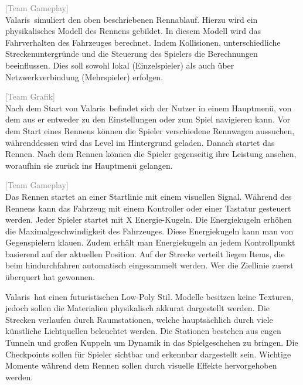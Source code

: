 \documentclass[parskip=full]{scrartcl}
\newcommand{\codename}{Valaris}
\begin{document}
	\textcolor{gray}{[Team Gameplay]}\\
	\codename\ simuliert den oben beschriebenen Rennablauf. Hierzu wird ein physikalisches Modell des Rennens gebildet. In diesem Modell wird das Fahrverhalten
	des Fahrzeuges berechnet. Indem Kollisionen, unterschiedliche Streckenuntergründe und die Steuerung des Spielers die Berechnungen beeinflussen.
	Dies soll sowohl lokal (Einzelspieler) als auch über Netzwerkverbindung (Mehrspieler) erfolgen. \par

	\textcolor{gray}{[Team Grafik]}\\
	Nach dem Start von \codename\ befindet sich der Nutzer in einem Hauptmenü, von dem aus er entweder zu den Einstellungen oder zum Spiel navigieren kann. Vor dem Start eines Rennens
	können die Spieler verschiedene Rennwagen aussuchen, währenddessen wird das Level im Hintergrund geladen. Danach startet das Rennen.
	Nach dem Rennen können die Spieler gegenseitig ihre Leistung ansehen, woraufhin sie zurück ins Hauptmenü gelangen. \par

	\textcolor{gray}{[Team Gameplay]}\\
	Das Rennen startet an einer Startlinie mit einem visuellen Signal. Während des Rennens kann das Fahrzeug mit einem Kontroller 
	oder einer Tastatur gesteuert werden. Jeder Spieler startet mit X Energie-Kugeln. Die Energiekugeln erhöhen die 
	Maximalgeschwindigkeit des Fahrzeuges. Diese Energiekugeln kann man von Gegenspielern klauen. 
	Zudem erhält man Energiekugeln an jedem Kontrollpunkt basierend auf der aktuellen Position.
	Auf der Strecke verteilt liegen Items, die beim hindurchfahren automatisch eingesammelt werden. Wer die Ziellinie zuerst überquert hat gewonnen. \par

	\codename\ hat einen futuristischen \gls{Low-Poly Stil}. Modelle besitzen keine Texturen, jedoch sollen die Materialien physikalisch akkurat dargestellt werden. Die Strecken
	verlaufen durch Raumstationen, welche hauptsächlich durch viele künstliche Lichtquellen beleuchtet werden. Die Stationen bestehen aus engen Tunneln und großen Kuppeln um Dynamik
	in das Spielgeschehen zu bringen. Die Checkpoints sollen für Spieler sichtbar und erkennbar dargestellt sein. Wichtige Momente während dem Rennen sollen durch visuelle Effekte hervorgehoben
	werden. \par

	\pagebreak
	
\end{document}
